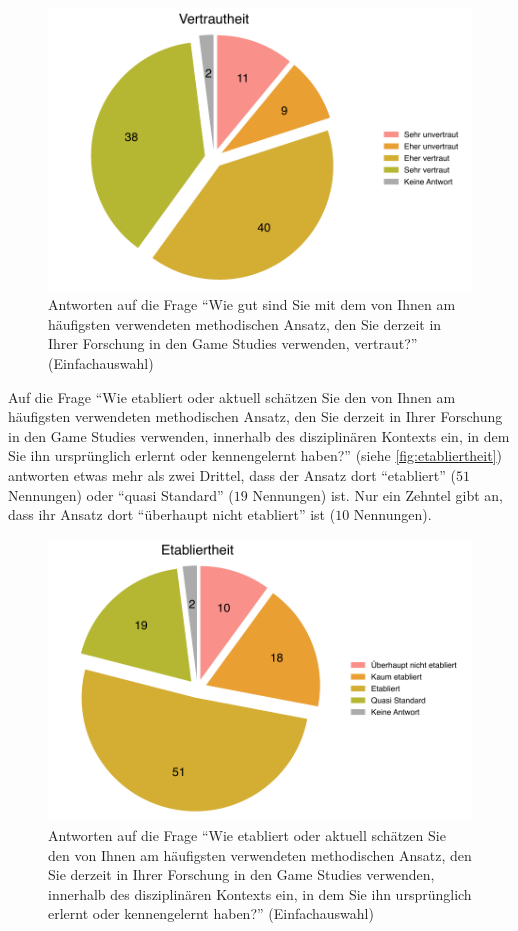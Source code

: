 \documentclass{scrartcl}
\begin{document}
\begin{figure}[ht]
   \includegraphics[width=1\textwidth]{vertrautheit.pdf}
   \caption{Antworten auf die Frage \enquote{Wie gut sind Sie mit dem von Ihnen am häufigsten verwendeten methodischen Ansatz, den Sie derzeit in Ihrer Forschung in den Game Studies verwenden, vertraut?} (Einfachauswahl)}
   \label{fig:vertrautheit}
\end{figure}

Auf die Frage \enquote{Wie etabliert oder aktuell schätzen Sie den von Ihnen am häufigsten verwendeten methodischen Ansatz, den Sie derzeit in Ihrer Forschung in den Game Studies verwenden, innerhalb des disziplinären Kontexts ein, in dem Sie ihn ursprünglich erlernt oder kennengelernt haben?} (siehe \autoref{fig:etabliertheit}) antworten etwas mehr als zwei Drittel, dass der Ansatz dort \enquote{etabliert} ($51$ Nennungen) oder \enquote{quasi Standard} ($19$ Nennungen) ist.
Nur ein Zehntel gibt an, dass ihr Ansatz dort \enquote{überhaupt nicht etabliert} ist ($10$ Nennungen).

\begin{figure}[ht]
   \includegraphics[width=1\textwidth]{etabliertheit.pdf}
   \caption{Antworten auf die Frage \enquote{Wie etabliert oder aktuell schätzen Sie den von Ihnen am häufigsten verwendeten methodischen Ansatz, den Sie derzeit in Ihrer Forschung in den Game Studies verwenden, innerhalb des disziplinären Kontexts ein, in dem Sie ihn ursprünglich erlernt oder kennengelernt haben?} (Einfachauswahl)}
   \label{fig:etabliertheit}
\end{figure}
\end{document}
